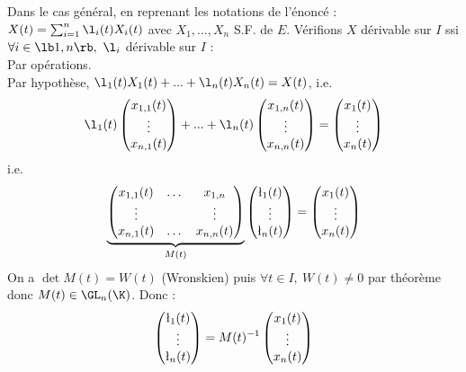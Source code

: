 \documentclass[11pt]{article}
\begin{document}
Dans le cas général, en reprenant les notations de l'énoncé : $X(t)=\sum_{i=1}^n \l_i(t)X_i(t)$ avec $X_1,...,X_n$ S.F. de $E$.
Vérifions $X$ dérivable sur $I$ ssi $\forall i \in \lb1,n\rb, ~ \l_i$ dérivable sur $I$ :\\
\boxed{\la} Par opérations.\\
\boxed{\ra} Par hypothèse, $\l_1(t)X_1(t) + ... + \l_n(t)X_n(t)=X(t)$, i.e. 
\begin{equation*}
    \l_1(t) \begin{pmatrix}x_{1,1}(t) \\ \vdots \\ x_{n,1}(t)\end{pmatrix} + ... + \l_n(t)\begin{pmatrix}x_{1,n}(t) \\ \vdots \\ x_{n,n}(t)\end{pmatrix} = \begin{pmatrix}x_1(t) \\ \vdots \\ x_n(t)\end{pmatrix}
\end{equation*}
i.e.
\begin{equation*}
    \underbrace{\begin{pmatrix}
        x_{1,1}(t) & \dots & x_{1,n} \\ \vdots & & \vdots \\ x_{n,1}(t) & \dots & x_{n,n}(t)
    \end{pmatrix}}_{M(t)} \begin{pmatrix} \l_1(t) \\ \vdots \\ \l_n(t) \end{pmatrix} = \begin{pmatrix} x_1(t) \\ \vdots \\ x_n(t) \end{pmatrix}
\end{equation*}
On a $\det M(t) = W(t)$ (Wronskien) puis $\forall t \in I, ~ W(t)\neq 0$ par théorème donc $M(t)\in\GL_n(\K)$. Donc :
\begin{equation*}
    \begin{pmatrix}\l_1(t) \\ \vdots \\ \l_n(t) \end{pmatrix} = M(t)^{-1} \begin{pmatrix}x_1(t) \\ \vdots \\ x_n(t)\end{pmatrix}
\end{equation*}
\end{document}
